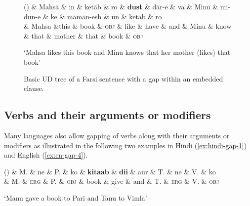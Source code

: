 \documentclass[11pt]{article}
\newenvironment{myquote}%
  {\list{}{\leftmargin=0.0in\rightmargin=0.0in}\item[]}%
  {\endlist}
\newcounter{excounter}
\begin{document}
\begin{figure*}
  \begin{center}
    \label{ex:farsi-gap-1}
    \footnotesize
    \begin{dependency}[edge unit distance=2.5ex]
      \begin{deptext}
        (\theexcounter) \& Mahs\=a \& in \& ket\=ab \& ro \& \textbf{dust} \& d\=ar-e \& va \& Minu \& mi-dun-e \& ke \& m\=am\=an-esh \& un \& ket\=ab \& ro \\
        \& Mahsa \&this \& book \& \textsc{obj} \& like \& have \& and \& Minu \& know \& that \& mother \& that \& book \&  \textsc{obj} \\
      \end{deptext}
    \end{dependency}
    \trans `Mahsa likes this book and Minu knows that her mother (likes) that book' \cite{Farudi2013}
  \end{center}
  \caption{Basic UD tree of a Farsi sentence with a gap within an embedded clause.}
  \label{fig:farsi-embedded}
\end{figure*}


\subsection{Verbs and their arguments or modifiers}

Many languages also allow gapping of verbs along with their arguments 
or modifiers as illustrated in the following two examples in Hindi (\ref{ex:hindi-gap-1}) 
and English (\ref{ex:en-gap-4}).



\begin{myquote}
  \label{ex:hindi-gap-1}
  \footnotesize
  \begin{dependency}[edge unit distance=2.5ex]
    \begin{deptext}[column sep=0.1cm]
      (\theexcounter)  \& M. \& ne \& P. \& ko \& \textbf{kitaab} \& \textbf{dii} \& aur \&  T. \& ne \& V. \& ko  \\
      \&          M. \& \tiny{\textsc{erg}} \& P. \& \tiny{\textsc{obj}} \& book \& give \& and \& T. \& \tiny{\textsc{erg}} \& V. \&  \tiny{\textsc{obj}}  \\
     \end{deptext}
  \end{dependency}
  \trans `Manu gave a book to Pari and Tanu to Vimla' \hfill \cite{Kush2016}
\end{myquote}
\end{document}
